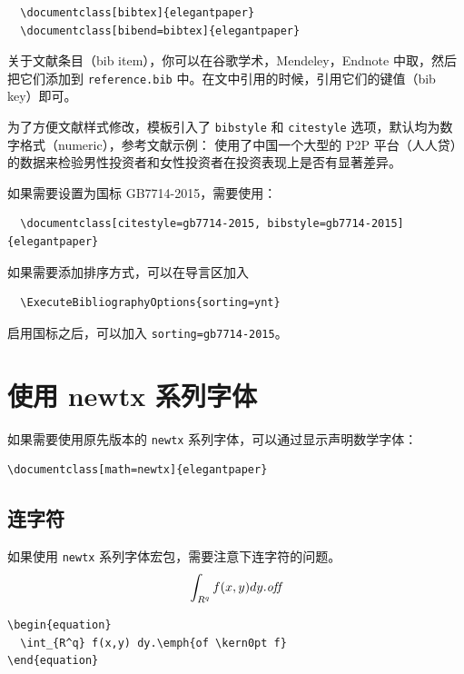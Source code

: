 \documentclass[lang=cn,a4paper]{elegantpaper}
\begin{document}
\begin{lstlisting}
  \documentclass[bibtex]{elegantpaper}
  \documentclass[bibend=bibtex]{elegantpaper}
\end{lstlisting}

关于文献条目（bib item），你可以在谷歌学术，Mendeley，Endnote 中取，然后把它们添加到 \lstinline{reference.bib} 中。在文中引用的时候，引用它们的键值（bib key）即可。

为了方便文献样式修改，模板引入了 \lstinline{bibstyle} 和 \lstinline{citestyle} 选项，默认均为数字格式（numeric），参考文献示例：\cite{cn1,en2,en3} 使用了中国一个大型的 P2P 平台（人人贷）的数据来检验男性投资者和女性投资者在投资表现上是否有显著差异。

如果需要设置为国标 GB7714-2015，需要使用：
\begin{lstlisting}
  \documentclass[citestyle=gb7714-2015, bibstyle=gb7714-2015]{elegantpaper} 
\end{lstlisting}

如果需要添加排序方式，可以在导言区加入
\begin{lstlisting}
  \ExecuteBibliographyOptions{sorting=ynt}
\end{lstlisting}

启用国标之后，可以加入 \lstinline{sorting=gb7714-2015}。


\section{使用 newtx 系列字体}

如果需要使用原先版本的 \lstinline{newtx} 系列字体，可以通过显示声明数学字体：

\begin{lstlisting}
\documentclass[math=newtx]{elegantpaper}
\end{lstlisting}

\subsection{连字符}

如果使用 \lstinline{newtx} 系列字体宏包，需要注意下连字符的问题。
\begin{equation}
  \int_{R^q} f(x,y) dy.\emph{of\kern0pt f}
\end{equation}

\begin{lstlisting}
\begin{equation}
  \int_{R^q} f(x,y) dy.\emph{of \kern0pt f}
\end{equation}
\end{lstlisting}
\end{document}
